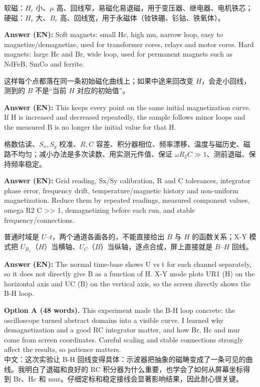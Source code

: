 \documentclass[11pt]{ctexart}
\begin{document}
软磁：\(H_c\) 小、\(\mu\) 高、回线窄，易磁化易退磁，用于变压器、继电器、电机铁芯；硬磁：\(H_c\) 大、\(B_r\) 高、回线宽，用于永磁体（钕铁硼、钐钴、铁氧体）。

\textbf{Answer (EN):} Soft magnets: small Hc, high mu, narrow loop, easy to magnetize/demagnetize, used for transformer cores, relays and motor cores. Hard magnets: large Hc and Br, wide loop, used for permanent magnets such as NdFeB, SmCo and ferrite.

这样每个点都落在同一条初始磁化曲线上；如果中途来回改变 \(H\)，会走小回线，测到的 \(B\) 不是“当前 \(H\) 对应的初始值”。

\textbf{Answer (EN):} This keeps every point on the same initial magnetization curve. If H is increased and decreased repeatedly, the sample follows minor loops and the measured B is no longer the initial value for that H.

格数估读、\(S_x,S_y\) 校准、\(R,C\) 容差、积分器相位、频率漂移、温度与磁历史、磁路不均匀；减小办法是多次读数、用实测元件值、保证 \(\omega R_2C\gg1\)、测前退磁、保持频率稳定。

\textbf{Answer (EN):} Grid reading, Sx/Sy calibration, R and C tolerances, integrator phase error, frequency drift, temperature/magnetic history and non-uniform magnetization. Reduce them by repeated readings, measured component values, omega R2 C >> 1, demagnetizing before each run, and stable frequency/connections.

普通时域是 \(U\)--\(t\)，两个通道各画各的，不能直接给出 \(B\) 与 \(H\) 的函数关系；X-Y 模式把 \(U_{R_1}\)（\(H\)）当横轴、\(U_C\)（\(B\)）当纵轴，逐点合成，屏上直接就是 \(B\)--\(H\) 回线。

\textbf{Answer (EN):} The normal time-base shows U vs t for each channel separately, so it does not directly give B as a function of H. X-Y mode plots UR1 (H) on the horizontal axis and UC (B) on the vertical axis, so the screen directly shows the B-H loop.


\textbf{Option A (48 words).} This experiment made the B-H loop concrete: the oscilloscope turned abstract domains into a visible curve. I learned why demagnetization and a good RC integrator matter, and how Br, Hc and mur come from screen coordinates. Careful scaling and stable connections strongly affect the results, so patience matters.\\
中文：这次实验让 B-H 回线变得具体：示波器把抽象的磁畴变成了一条可见的曲线。我明白了退磁和良好的 RC 积分器为什么重要，也学会了如何从屏幕坐标得到 Br、Hc 和 mur。仔细定标和稳定接线会显著影响结果，因此耐心很关键。
\end{document}
